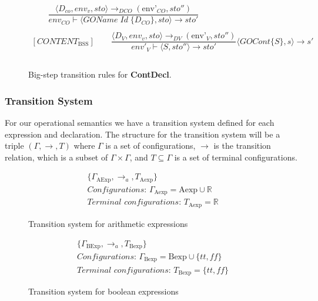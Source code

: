 \begin{figure}[htbp]
	\centering
	\begin{gather*}
		[GAMEOBJECT_\text{BSS}] 
		\qquad \dfrac
		{\langle D_{co}, env_v, sto\rangle \rightarrow_{DCO} (\text{env'}_{CO}, sto'')}
		{env_{CO} \vdash \langle GOName \; Id \; \{D_{CO}\}, sto\rangle\rightarrow sto'}
		\\
		\\
		[CONTENT_\text{BSS}] 
		\qquad \dfrac
		{\langle D_V, env_v, sto\rangle \rightarrow_{DV} (\text{env'}_V, sto'')}
		{env'_V \vdash \langle S, sto''\rangle \rightarrow sto'}
		{\langle GOCont \{S\}, s\rangle\rightarrow s'}
		\\
		\\
	\end{gather*}
	\caption{Big-step transition rules for \textbf{ContDecl}.}
	\label{fig:BssStm}
\end{figure}


\subsubsection*{Transition System}

For our operational semantics we have a transition system defined for each expression and declaration. 
The structure for the transition system will be a triple $(\Gamma,\rightarrow,T)$ where $\Gamma$ is a set of configurations, $\rightarrow$ is the transition relation, which is a subset of $\Gamma\times\Gamma$, and $T\subseteq \Gamma$ is a set of terminal configurations. \cite{huttelTransitionsTreesIntroduction2010}


\begin{figure}
	\begin{gather*} 
		\{ \Gamma_\text{AExp}, \rightarrow_a, T_\text{Aexp} \} \\ 
		\textit{Configurations: } \Gamma_\text{Aexp} = \text{Aexp} \cup \mathbb{R} \\ 
		\textit{Terminal configurations: } T_\text{Aexp} = \mathbb{R}
	\end{gather*}
	\label{fig:TS_Aexp}
	\caption{Transition system for arithmetic expressions}
\end{figure}

\begin{figure}
	\begin{gather*} 
		\{ \Gamma_\text{BExp}, \rightarrow_a, T_\text{Bexp} \} \\ 
		\textit{Configurations: } \Gamma_\text{Bexp} = \text{Bexp} \cup \{tt, f\!f\} \\ 
		\textit{Terminal configurations: } T_\text{Bexp} = \{tt, f\!f\}
	\end{gather*}
	\label{fig:TS_Bexp}
	\caption{Transition system for boolean expressions}
\end{figure}

